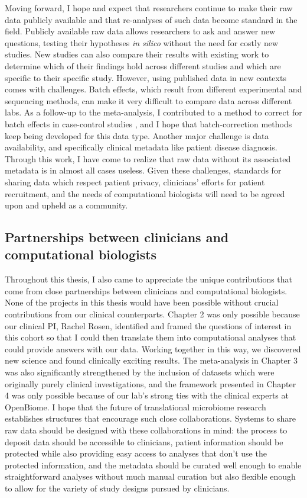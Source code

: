 Moving forward, I hope and expect that researchers continue to make their raw data publicly available and that re-analyses of such data become standard in the field.
Publicly available raw data allows researchers to ask and answer new questions, testing their hypotheses \textit{in silico} without the need for costly new studies.
New studies can also compare their results with existing work to determine which of their findings hold across different studies and which are specific to their specific study.
However, using published data in new contexts comes with challenges.
Batch effects, which result from different experimental and sequencing methods, can make it very difficult to compare data across different labs.
As a follow-up to the meta-analysis, I contributed to a method to correct for batch effects in case-control studies \cite{gibbons-2018}, and I hope that batch-correction methods keep being developed for this data type.
Another major challenge is data availability, and specifically clinical metadata like patient disease diagnosis.
Through this work, I have come to realize that raw data without its associated metadata is in almost all cases useless.
Given these challenges, standards for sharing data which respect patient privacy, clinicians' efforts for patient recruitment, and the needs of computational biologists will need to be agreed upon and upheld as a community.

\subsection{Partnerships between clinicians and computational biologists}

Throughout this thesis, I also came to appreciate the unique contributions that come from close partnerships between clinicians and computational biologists.
None of the projects in this thesis would have been possible without crucial contributions from our clinical counterparts.
Chapter 2 was only possible because our clinical PI, Rachel Rosen, identified and framed the questions of interest in this cohort so that I could then translate them into computational analyses that could provide answers with our data.
Working together in this way, we discovered new science and found clinically exciting results.
The meta-analysis in Chapter 3 was also significantly strengthened by the inclusion of datasets which were originally purely clinical investigations, and the framework presented in Chapter 4 was only possible because of our lab's strong ties with the clinical experts at OpenBiome.
I hope that the future of translational microbiome research establishes structures that encourage such close collaborations.
Systems to share raw data should be designed with these collaborations in mind: the process to deposit data should be accessible to clinicians, patient information should be protected while also providing easy access to analyses that don't use the protected information, and the metadata should be curated well enough to enable straightforward analyses without much manual curation but also flexible enough to allow for the variety of study designs pursued by clinicians.

